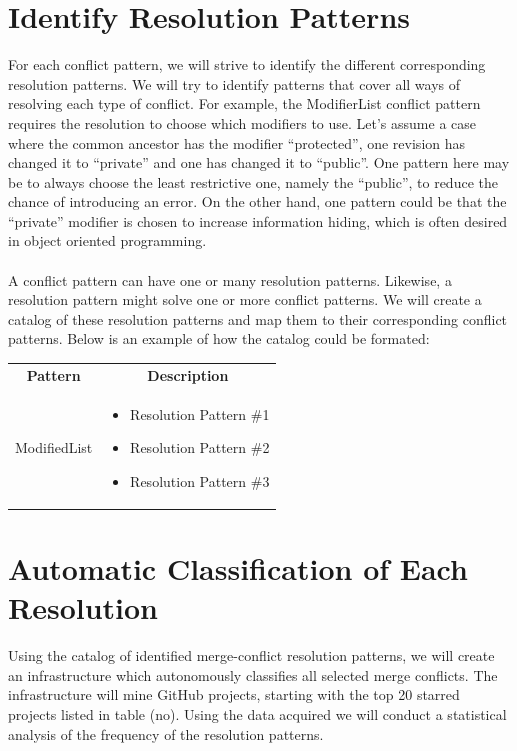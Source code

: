 \section{Identify Resolution Patterns}
For each conflict pattern, we will strive to identify the different corresponding resolution patterns. We will try to identify patterns that cover all ways of resolving each type of conflict. For example, the ModifierList conflict pattern requires the resolution to choose which modifiers to use. Let's assume a case where the common ancestor has the modifier “protected”, one revision has changed it to “private” and one has changed it to “public”. One pattern here may be to always choose the least restrictive one, namely the “public”, to reduce the chance of introducing an error. On the other hand, one pattern could be that the “private” modifier is chosen to increase information hiding, which is often desired in object oriented programming.
\paragraph*{}
A conflict pattern can have one or many resolution patterns. Likewise, a resolution pattern might solve one or more conflict patterns. We will create a catalog of these resolution patterns and map them to their corresponding conflict patterns. Below is an example of how the catalog could be formated:\\
\begin{tabular}{ p{8cm} p{6cm} }
\hline
\multicolumn{1}{c}{\textbf{Pattern}} & \multicolumn{1}{c}{\textbf{Description}}\\
ModifiedList &
\begin{itemize}
\item Resolution Pattern \#1
\item Resolution Pattern \#2
\item Resolution Pattern \#3
\end{itemize}
\end{tabular}
\section{Automatic Classification of Each Resolution}
Using the catalog of identified merge-conflict resolution patterns, we will create an infrastructure which autonomously classifies all selected merge conflicts. The infrastructure will mine GitHub projects, starting with the top 20 starred projects listed in table (no). Using the data acquired we will conduct a statistical analysis of the frequency of the resolution patterns.